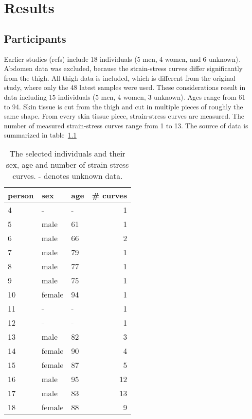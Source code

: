 \chapter{Results}

\section{Participants}

Earlier studies (refs) include 18 individuals (5 men, 4 women, and 6 unknown).
Abdomen data was excluded, because the strain-stress curves differ significantly from the thigh.
All thigh data is included, which is different from the original study, where only the 48 latest samples were used.
These considerations result in data including 15 individuals (5 men, 4 women, 3 unknown).
Ages range from 61 to 94.
Skin tissue is cut from the thigh and cut in multiple pieces of roughly the same shape.
From every skin tissue piece, strain-stress curves are measured.
The number of measured strain-stress curves range from 1 to 13.
The source of data is summarized in table~\ref{tab:source_of_data}
\begin{table}
    \centering
    \caption[Source of data]{
        The selected individuals and their sex, age and number of strain-stress curves.
        - denotes unknown data.
    }
    \label{tab:source_of_data}
    \begin{tabular}{lllr}
        \toprule
        person & sex    & age & \# curves \\
        \midrule
        4      & -      & -   & 1         \\
        5      & male   & 61  & 1         \\
        6      & male   & 66  & 2         \\
        7      & male   & 79  & 1         \\
        8      & male   & 77  & 1         \\
        9      & male   & 75  & 1         \\
        10     & female & 94  & 1         \\
        11     & -      & -   & 1         \\
        12     & -      & -   & 1         \\
        13     & male   & 82  & 3         \\
        14     & female & 90  & 4         \\
        15     & female & 87  & 5         \\
        16     & male   & 95  & 12        \\
        17     & male   & 83  & 13        \\
        18     & female & 88  & 9         \\
        \bottomrule
    \end{tabular}
\end{table}